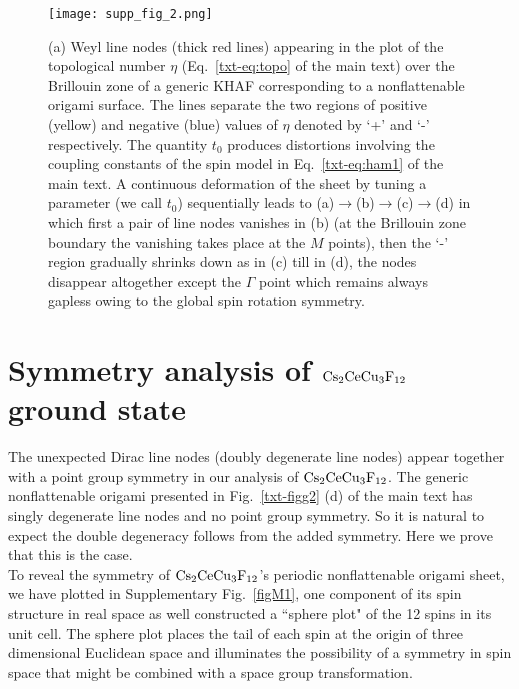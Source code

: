 \documentclass[a4paper,aps,prl,floatfix,showpacs,superscriptaddress,notitlepage]{revtex4-1}
\begin{document}
\begin{figure*}
\centering
 \texttt{[image: supp\_fig\_2.png]}
 \caption{(a) Weyl line nodes (thick red lines) appearing in the plot of the topological number $\eta$ (Eq.~\ref{txt-eq:topo} of the main text) over the Brillouin zone of a generic KHAF corresponding to a nonflattenable origami surface. The lines separate the two regions of positive (yellow) and negative (blue) values of $\eta$ denoted by `+' and `-' respectively. The quantity $t_0$ produces distortions involving the coupling constants of the spin model in Eq.~\ref{txt-eq:ham1} of the main text. A continuous deformation of the sheet by tuning a parameter (we call $t_0$) sequentially leads to (a)$\rightarrow$(b)$\rightarrow$(c)$\rightarrow$(d) in which first a pair of line nodes vanishes in (b) (at the Brillouin zone boundary the vanishing takes place at the $M$ points), then the `-' region gradually shrinks down as in (c) till in (d), the nodes disappear altogether except the $\Gamma$ point which remains always gapless owing to the global spin rotation symmetry.}
 \label{fig_weyl} 
\end{figure*}



\section{Symmetry analysis of ${\rm Cs}_2{\rm CeCu}_3{\rm F}_{12}$ ground state}\label{secfive}

The unexpected Dirac line nodes (doubly degenerate line nodes) appear together with a point group symmetry in our analysis of ${\rm Cs}_2{\rm CeCu}_3{\rm F}_{12}$. The generic nonflattenable origami presented in Fig.~\ref{txt-figg2} (d) of the main text has singly degenerate line nodes and no point group symmetry. So it is natural to expect the double degeneracy follows from the added symmetry. Here we prove that this is the case.\\


To reveal the symmetry of ${\rm Cs}_2{\rm CeCu}_3{\rm F}_{12}$'s periodic nonflattenable origami sheet, we have plotted in Supplementary Fig.~\ref{figM1}, one component of its spin structure in real space as well constructed a ``sphere plot" of the 12 spins in its unit cell. The sphere plot places the tail of each spin at the origin of three dimensional Euclidean space and illuminates the possibility of a symmetry in spin space that might be combined with a space group transformation.\\
\end{document}
